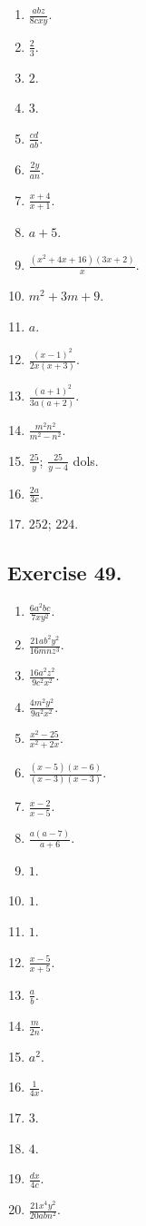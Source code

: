 \documentclass{book}
\begin{document}
\begin{enumerate}
\item $\displaystyle \frac{abz}{8cxy}$. \item $ \frac{2}{3}$.
\item $2$. \item $3$. \item $\displaystyle \frac{cd}{ab}$. \item
$\displaystyle \frac{2y}{an}$. \item $\displaystyle
\frac{x+4}{x+1}$. \item $a+5$. \item $\displaystyle
\frac{(x^2+4x+16)(3x+2)}{x}$. \item $m^2+3m+9$. \item $a$. \item
$\displaystyle \frac{\left(x-1\right)^2}{2x(x+3)}$. \item
$\displaystyle \frac{\left(a+1\right)^2}{3a(a+2)}$. \item
$\displaystyle \frac{m^2 n^2}{m^2-n^2}$. \item $\displaystyle
\frac{25}{y}$; $\displaystyle \frac{25}{y-4}$ dols. \item
$\displaystyle \frac{2a}{3c}$. \item $252$; $224$.
\end{enumerate}

\subsection*{Exercise 49.}

\begin{enumerate}
\item $\displaystyle \frac{6a^2bc}{7xy^2}$. \item $\displaystyle
\frac{21ab^2y^2}{16mnz^3}$. \item $\displaystyle
\frac{16a^2z^2}{9c^2x^2}$. \item $\displaystyle
\frac{4m^2y^2}{9a^2x^2}$. \item $\displaystyle
\frac{x^2-25}{x^2+2x}$. \item $\displaystyle
\frac{(x-5)(x-6)}{(x-3)(x-3)}$. \item $\displaystyle
\frac{x-2}{x-5}$. \item $\displaystyle \frac{a(a-7)}{a+6}$. \item
$1$. \item $1$. \item $1$. \item $\displaystyle \frac{x-5}{x+5}$.
\item $\displaystyle \frac{a}{b}$. \item $\displaystyle
\frac{m}{2n}$. \item $a^2$. \item $\displaystyle \frac{1}{4x}$.
\item $3$. \item $4$. \item $\displaystyle \frac{dx}{4c}$. \item
$\displaystyle \frac{21x^4y^2}{20abn^2}$.
\end{enumerate}
\end{document}
